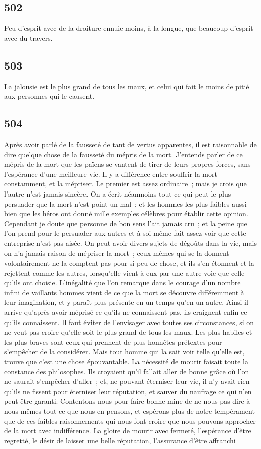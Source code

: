 \documentclass[french,twoside]{book} %
\begin{document}
\subsection[{502}]{ \textsc{502} }
\noindent Peu d’esprit avec de la droiture ennuie moins, à la longue, que beaucoup d’esprit avec du travers.
\subsection[{503}]{ \textsc{503} }
\noindent La jalousie est le plus grand de tous les maux, et celui qui fait le moins de pitié aux personnes qui le causent.
\subsection[{504}]{ \textsc{504} }
\noindent Après avoir parlé de la fausseté de tant de vertus apparentes, il est raisonnable de dire quelque chose de la fausseté du mépris de la mort. J’entends parler de ce mépris de la mort que les païens se vantent de tirer de leurs propres forces, sans l’espérance d’une meilleure vie. Il y a différence entre souffrir la mort constamment, et la mépriser. Le premier est assez ordinaire ; mais je crois que l’autre n’est jamais sincère. On a écrit néanmoins tout ce qui peut le plus persuader que la mort n’est point un mal ; et les hommes les plus faibles aussi bien que les héros ont donné mille exemples célèbres pour établir cette opinion. Cependant je doute que personne de bon sens l’ait jamais cru ; et la peine que l’on prend pour le persuader aux autres et à soi-même fait assez voir que cette entreprise n’est pas aisée. On peut avoir divers sujets de dégoûts dans la vie, mais on n’a jamais raison de mépriser la mort ; ceux mêmes qui se la donnent volontairement ne la comptent pas pour si peu de chose, et ils s’en étonnent et la rejettent comme les autres, lorsqu’elle vient à eux par une autre voie que celle qu’ils ont choisie. L’inégalité que l’on remarque dans le courage d’un nombre infini de vaillants hommes vient de ce que la mort se découvre différemment à leur imagination, et y paraît plus présente en un temps qu’en un autre. Ainsi il arrive qu’après avoir méprisé ce qu’ils ne connaissent pas, ils craignent enfin ce qu’ils connaissent. Il faut éviter de l’envisager avec toutes ses circonstances, si on ne veut pas croire qu’elle soit le plus grand de tous les maux. Les plus habiles et les plus braves sont ceux qui prennent de plus honnêtes prétextes pour s’empêcher de la considérer. Mais tout homme qui la sait voir telle qu’elle est, trouve que c’est une chose épouvantable. La nécessité de mourir faisait toute la constance des philosophes. Ils croyaient qu’il fallait aller de bonne grâce où l’on ne saurait s’empêcher d’aller ; et, ne pouvant éterniser leur vie, il n’y avait rien qu’ils ne fissent pour éterniser leur réputation, et sauver du naufrage ce qui n’en peut être garanti. Contentons-nous pour faire bonne mine de ne nous pas dire à nous-mêmes tout ce que nous en pensons, et espérons plus de notre tempérament que de ces faibles raisonnements qui nous font croire que nous pouvons approcher de la mort avec indifférence. La gloire de mourir avec fermeté, l’espérance d’être regretté, le désir de laisser une belle réputation, l’assurance d’être affranchi 
\end{document}
